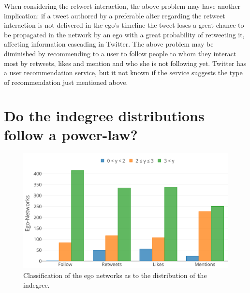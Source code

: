 When considering the retweet interaction, the above problem may have another implication: if a tweet authored by a preferable alter regarding the retweet interaction is not delivered in the ego’s timeline the tweet loses a great chance to be propagated in the network by an ego with a great probability of retweeting it, affecting information cascading in Twitter. The above problem may be diminished by recommending to a user to follow people to whom they interact most by retweets, likes and mention and who she is not following yet. Twitter has a user recommendation service, but it not known if the service suggests the type of recommendation just mentioned above.






\section{Do the indegree distributions follow a power-law?}
\label{sec:QuestionPowerLaw}

\begin{figure}[h!tb]
    \centering
    \includegraphics[width=1\textwidth]{fig/net_struct/in_degree_distribution.png}
    \caption{Classification of the ego networks as to the distribution of the indegree.}
    \label{fig:net_struct_indegree_distribution}
\end{figure}

